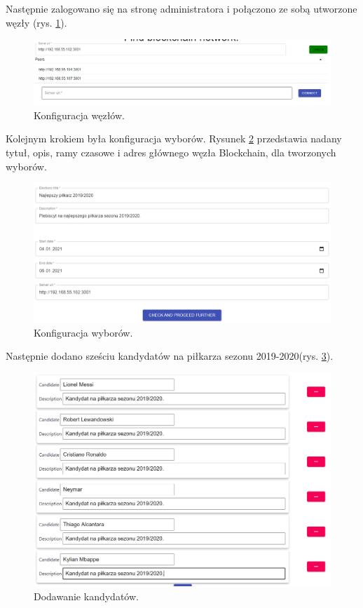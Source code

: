 \documentclass[a4paper,12pt]{book}
\begin{document}
Następnie zalogowano się na stronę administratora i połączono ze sobą utworzone węzły (rys. \ref{KonfiguracjaSieci}).

\begin{figure}[H]
  \centering
\includegraphics[width=\textwidth]{images/KonfiguracjaSieci.png}
\caption{Konfiguracja węzłów.}\label{KonfiguracjaSieci}
\end {figure}

Kolejnym krokiem była konfiguracja wyborów. Rysunek \ref{bestplayercfg} przedstawia nadany tytuł, opis, ramy czasowe i adres głównego węzła Blockchain, dla tworzonych wyborów.

\begin{figure}[H]
  \centering
\includegraphics[width=\textwidth]{images/bestplayercfg.png}
\caption{Konfiguracja wyborów.}\label{bestplayercfg}
\end {figure}

Następnie dodano sześciu kandydatów na piłkarza sezonu 2019-2020(rys. \ref{addedplayers}).

\begin{figure}[H]
  \centering
\includegraphics[width=\textwidth]{images/addedplayers.png}
\caption{Dodawanie kandydatów.}\label{addedplayers}
\end {figure}
\end{document}
